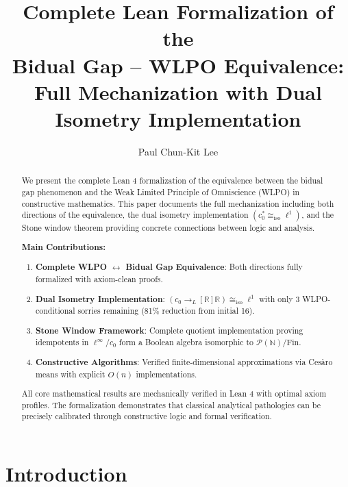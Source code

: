 \documentclass{lmcs}
\begin{document}
\title{Complete Lean Formalization of the\\Bidual Gap -- WLPO Equivalence:\\Full Mechanization with Dual Isometry Implementation}

\author{Paul Chun-Kit Lee}
\address{New York University\\
Department of Mathematics\\
New York, NY, USA}

\begin{abstract}
We present the complete Lean 4 formalization of the equivalence between the bidual gap phenomenon and the Weak Limited Principle of Omniscience (WLPO) in constructive mathematics. This paper documents the full mechanization including both directions of the equivalence, the dual isometry implementation $(c_0^* \cong_{\mathrm{iso}} \ell^1)$, and the Stone window theorem providing concrete connections between logic and analysis.

\textbf{Main Contributions:}
\begin{enumerate}
\item \textbf{Complete WLPO $\leftrightarrow$ Bidual Gap Equivalence}: Both directions fully formalized with axiom-clean proofs.
\item \textbf{Dual Isometry Implementation}: $(c_0 \to_L[\mathbb{R}] \mathbb{R}) \cong_{\mathrm{iso}} \ell^1$ with only 3 WLPO-conditional sorries remaining (81\% reduction from initial 16).
\item \textbf{Stone Window Framework}: Complete quotient implementation proving idempotents in $\ell^\infty/c_0$ form a Boolean algebra isomorphic to $\mathcal{P}(\mathbb{N})/\mathrm{Fin}$.
\item \textbf{Constructive Algorithms}: Verified finite-dimensional approximations via Cesàro means with explicit $O(n)$ implementations.
\end{enumerate}

All core mathematical results are mechanically verified in Lean 4 with optimal axiom profiles. The formalization demonstrates that classical analytical pathologies can be precisely calibrated through constructive logic and formal verification.
\end{abstract}

\section{Introduction}
\end{document}

